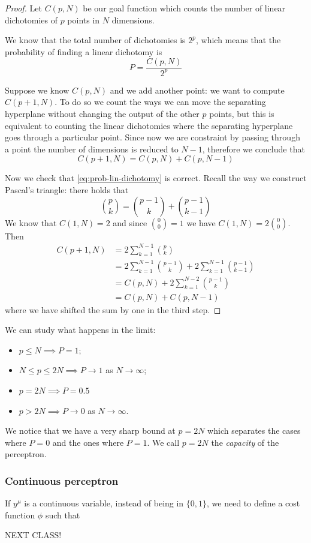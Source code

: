 \documentclass[12pt]{extarticle}
\begin{document}
\begin{proof}
	Let $C(p, N)$ be our goal function which counts the number of linear dichotomies of $p$ points
	in $N$ dimensions.

	We know that the total number of dichotomies is $2^p$, which means that the probability of finding
	a linear dichotomy is
	\begin{equation}
		P = \frac{C(p, N)}{2^p}
	\end{equation}

	Suppose we know $C(p, N)$ and we add another point: we want to compute $C(p + 1, N)$.
	To do so we count the ways we can move the separating hyperplane without changing the output
	of the other $p$ points, but this is equivalent to counting the linear dichotomies where
	the separating hyperplane goes through a particular point.
	Since now we are constraint by passing through a point the number of dimensions
	is reduced to $N-1$, therefore we conclude that
	\begin{equation}
		C(p+1, N) = C(p, N) + C(p, N-1)
	\end{equation}

	Now we check that \cref{eq:prob-lin-dichotomy} is correct.
	Recall the way we construct Pascal's triangle: there holds that
	\begin{equation}
		\binom{p}{k} = \binom{p-1}{k} + \binom{p-1}{k-1}
	\end{equation}
	We know that $C(1, N) = 2$ and since $\binom{0}{0} = 1$ we have $C(1, N) = 2 \binom{0}{0}$.
	Then
	\begin{align}
		C(p+1, N) & = 2 \sum_{k = 1}^{N-1} \binom{p}{k}                                           \\
		          & = 2 \sum_{k = 1}^{N-1} \binom{p-1}{k} + 2 \sum_{k = 1}^{N-1} \binom{p-1}{k-1} \\
		          & = C(p, N) + 2 \sum_{k = 1}^{N-2} \binom{p-1}{k}                               \\
		          & = C(p, N) + C(p, N-1)
	\end{align}
	where we have shifted the sum by one in the third step.
\end{proof}

We can study what happens in the limit:
\begin{itemize}
	\item $p \leq N \implies P = 1$;
	\item $N \leq p \leq 2N \implies P \to 1$ as $N \to \infty$;
	\item $p = 2N \implies P = 0.5$
	\item $p > 2N \implies P \to 0$ as $N\to \infty$.
\end{itemize}
We notice that we have a very sharp bound at $p = 2N$ which separates the cases where $P = 0$ and
the ones where $P = 1$. We call $p = 2N$ the \emph{capacity} of the perceptron.

\subsubsection{Continuous perceptron}
If $y^\mu$ is a continuous variable, instead of being in $\{0, 1\}$, we need to define a cost
function $\phi$ such that

NEXT CLASS!
\end{document}

